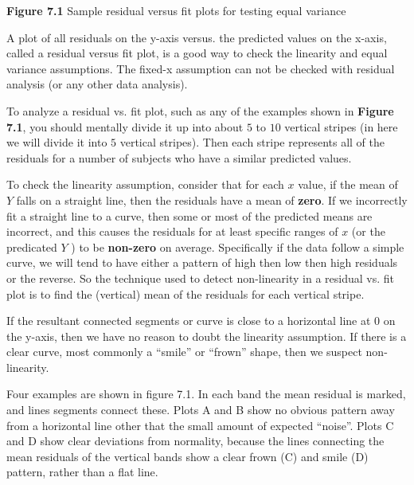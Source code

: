\documentclass{article}
\begin{document}
\begin{multicols}{2}
\begin{center}
    \end{center}
    \end{multicols}
    
    \begin{center} 
         \textbf{Figure 7.1} Sample residual versus fit plots for testing equal variance
    \end{center}
    
    A plot of all residuals on the y-axis versus. the predicted values on the x-axis, called a residual versus fit plot, is a good way to check the linearity and equal variance assumptions. The fixed-x assumption can not be checked with residual analysis (or any other data analysis). 
    
     To analyze a residual vs. fit plot, such as any of the examples shown in \textbf{Figure 7.1}, you should mentally divide it up into about $5$ to $10$ vertical stripes (in here we will divide it into $5$ vertical stripes). Then each stripe represents all of the residuals for a number of subjects who have a similar predicted values.
     
     To check the linearity assumption, consider that for each $x$ value, if the mean of $Y$ falls on a straight line, then the residuals have a mean of \textbf{zero}. If we incorrectly fit a straight line to a curve, then some or most of the predicted means are incorrect, and this causes the residuals for at least specific ranges of $x$ (or the predicated $Y$ ) to be \textbf{non-zero} on average. Specifically if the data follow a simple curve, we will tend to have either a pattern of high then low then high residuals or the reverse. So the technique used to detect non-linearity in a residual vs. fit plot is to find the (vertical) mean of the residuals for each vertical stripe. 
     
     If the resultant connected segments or curve is close to a horizontal line at 0 on the y-axis, then we have no reason to doubt the linearity assumption. If there is a clear curve, most commonly a “smile” or “frown” shape, then we suspect non-linearity. 
     
     Four examples are shown in figure 7.1. In each band the mean residual is marked, and lines segments connect these. Plots A and B show no obvious pattern away from a horizontal line other that the small amount of expected “noise”. Plots C and D show clear deviations from normality, because the lines connecting the mean residuals of the vertical bands show a clear frown (C) and smile (D) pattern, rather than a flat line.
     
\end{document}
